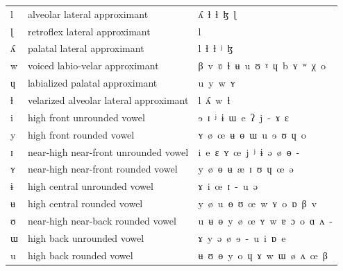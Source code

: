 \begin{center}
\begin{tabular}{lll}
l & alveolar lateral approximant & ʎ\ ɫ\ ɬ\ ɮ\ \color{gray}ɭ\\
ɭ & retroflex lateral approximant & l\\
ʎ & palatal lateral approximant & l\ ɬ\ ɫ\ ʲ\ \color{gray}ɮ\\
w & voiced labio-velar approximant & β\ v\ ʋ\ ɫ\ ʉ\ u\ \color{gray}ʊ\ ˠ\ ɥ\ b\ ʏ\ ʷ\ χ\ o\\
ɥ & labialized palatal approximant & u\ y\ \color{gray}w\ ʏ\\
ɫ & velarized alveolar lateral approximant & l\ ʎ\ w\ ɬ\\
i & high front unrounded vowel & ɘ\ ɪ\ ʲ\ ɨ\ ɯ\ e\ \color{gray}ʔ\ j\ -\ ɤ\ ɛ\\
y & high front rounded vowel & ʏ\ ø\ œ\ ʉ\ ɵ\ ɯ\ u\ ɘ\ ʊ\ ɥ\ \color{gray}o\\
ɪ & near-high near-front unrounded vowel & i\ e\ ɛ\ \color{gray}ʏ\ œ\ j\ ʲ\ ɨ\ ə\ ø\ ɵ\ -\\
ʏ & near-high near-front rounded vowel & y\ ø\ ɵ\ ʉ\ æ\ ɪ\ \color{gray}ʊ\ ɥ\ œ\ ə\\
ɨ & high central unrounded vowel & ɤ\ i\ œ\ ɪ\ \color{gray}-\ u\ ə\\
ʉ & high central rounded vowel & y\ ø\ u\ ɵ\ ʊ\ œ\ w\ ʏ\ o\ \color{gray}ɒ\ β\ v\\
ʊ & near-high near-back rounded vowel & u\ ʉ\ ɵ\ y\ ø\ œ\ ʏ\ w\ \color{gray}ɐ\ ɔ\ o\ ɑ\ ʌ\ -\\
ɯ & high back unrounded vowel & ɤ\ y\ ə\ ø\ ɘ\ -\ u\ \color{gray}i\ ɒ\ e\\
u & high back rounded vowel & ʉ\ ʊ\ ɵ\ y\ o\ ɥ\ ɤ\ w\ ɯ\ \color{gray}ø\ ʌ\ œ\ β\\
\hline
\end{tabular}
%
\addtocounter{figure}{-1}
\end{center}

